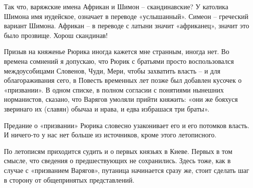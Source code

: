 Так что, варяжские имена Африкан и Шимон –  скандинавские? У католика Шимона имя иудейское, означает в переводе «услышанный». Симеон – греческий вариант Шимона. Африкан – в переводе с латыни значит «африканец», значит это было прозвище. Хорош скандинав!

Призыв на княженье Рюрика иногда кажется мне странным, иногда нет. Во времена сомнений я допускаю, что Рюрик с братьями просто воспользовался междоусобицами Словенов, Чуди, Мери, чтобы захватить власть – и для облагораживания сего, в Повесть временных лет позже был добавлен кусочек о «призвании». В одном списке, в полном согласии с понятиями нынешних норманистов, сказано, что Варягов умоляли прийти княжить: «они же бояхуся зверинаго их (славян) обычаа и нрава, и едва избрашася три браты».
 
Предание о «призвании» Рюрика словесно узаконивает его и его потомков власть. И ничего-то у нас нет больше из источников, кроме этого летописного.

По летописям приходится судить и о первых князьях в Киеве. Первых в том смысле, что сведения о предшествующих не сохранились. Здесь тоже, как в случае с «призванием Варягов», путаница начинается сразу же, стоит сделать шаг в сторону от общепринятых представлений.
